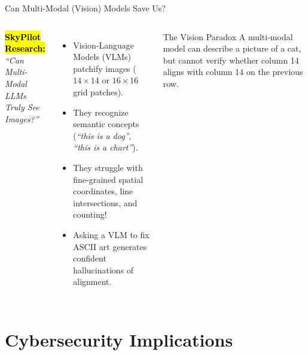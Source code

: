 \documentclass[12pt]{beamer}
\begin{document}
\begin{frame}[t]{Can Multi-Modal (Vision) Models Save Us?}
  \begin{columns}[T]
      \textbf{\hl{SkyPilot Research:}} \\
      \textit{\small ``Can Multi-Modal LLMs Truly See Images?''}
      \begin{itemize}
        \small
        \item Vision-Language Models (VLMs) patchify images ($14 \times 14$ or $16 \times 16$ grid patches).
        \item They recognize semantic concepts (\textit{``this is a dog''}, \textit{``this is a chart''}).
        \item They struggle with fine-grained spatial coordinates, line intersections, and counting!
        \item Asking a VLM to fix ASCII art generates confident hallucinations of alignment.
      \end{itemize}

      \begin{alertblock}{The Vision Paradox}
        \small
        A multi-modal model can describe a picture of a cat, but cannot verify whether column 14 aligns with column 14 on the previous row.
      \end{alertblock}
      \vspace{0.1cm}
      \centering
      \scriptsize{}
  \end{columns}
\end{frame}

\section{Cybersecurity Implications}
\end{document}

